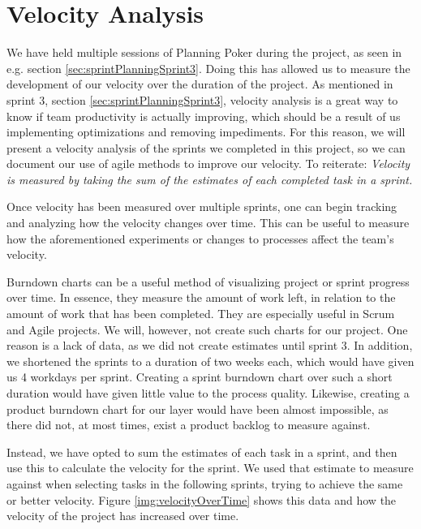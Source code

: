 \section{Velocity Analysis}\label{sec:velocityAnalysis}
We have held multiple sessions of Planning Poker during the project, as seen in e.g. section \ref{sec:sprintPlanningSprint3}.
Doing this has allowed us to measure the development of our velocity over the duration of the project. As mentioned in sprint 3, section \ref{sec:sprintPlanningSprint3}, velocity analysis is a great way to know if team productivity is actually improving, which should be a result of us implementing optimizations and removing impediments. For this reason, we will present a velocity analysis of the sprints we completed in this project, so we can document our use of agile methods to improve our velocity.
To reiterate: \textit{Velocity is measured by taking the sum of the estimates of each completed task in a sprint\cite{sutherlandScrumArtDoing2014}.}

Once velocity has been measured over multiple sprints, one can begin tracking and analyzing how the velocity changes over time. This can be useful to measure how the aforementioned experiments or changes to processes affect the team's velocity.

Burndown charts can be a useful method of visualizing project or sprint progress over time. In essence, they measure the amount of work left, in relation to the amount of work that has been completed. They are especially useful in Scrum and Agile projects\cite{HowCreateBurndown2021}. We will, however, not create such charts for our project. One reason is a lack of data, as we did not create estimates until sprint 3.
In addition, we shortened the sprints to a duration of two weeks each, which would have given us 4 workdays per sprint. Creating a sprint burndown chart over such a short duration would have given little value to the process quality.
Likewise, creating a product burndown chart for our layer would have been almost impossible, as there did not, at most times, exist a product backlog to measure against.

Instead, we have opted to sum the estimates of each task in a sprint, and then use this to calculate the velocity for the sprint. We used that estimate to measure against when selecting tasks in the following sprints, trying to achieve the same or better velocity. Figure \ref{img:velocityOverTime} shows this data and how the velocity of the project has increased over time.

